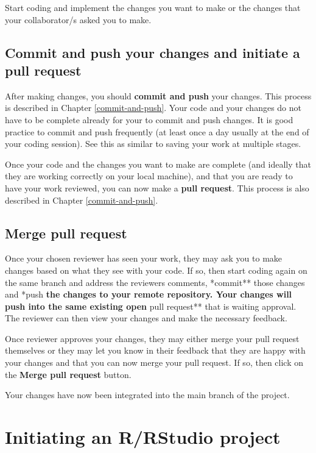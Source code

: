 \documentclass[
  12pt,
]{book}
\begin{document}
Start coding and implement the changes you want to make or the changes that your collaborator/s asked you to make.

\hypertarget{commit-and-push-your-changes-and-initiate-a-pull-request}{%
\section{Commit and push your changes and initiate a pull request}\label{commit-and-push-your-changes-and-initiate-a-pull-request}}

After making changes, you should \textbf{commit and push} your changes. This process is described in Chapter \ref{commit-and-push}. Your code and your changes do not have to be complete already for your to commit and push changes. It is good practice to commit and push frequently (at least once a day usually at the end of your coding session). See this as similar to saving your work at multiple stages.

Once your code and the changes you want to make are complete (and ideally that they are working correctly on your local machine), and that you are ready to have your work reviewed, you can now make a \textbf{pull request}. This process is also described in Chapter \ref{commit-and-push}.

\hypertarget{merge-pull-request}{%
\section{Merge pull request}\label{merge-pull-request}}

Once your chosen reviewer has seen your work, they may ask you to make changes based on what they see with your code. If so, then start coding again on the same branch and address the reviewers comments, *commit** those changes and *push\textbf{ the changes to your remote repository. Your changes will push into the same existing open }pull request** that is waiting approval. The reviewer can then view your changes and make the necessary feedback.

Once reviewer approves your changes, they may either merge your pull request themselves or they may let you know in their feedback that they are happy with your changes and that you can now merge your pull request. If so, then click on the \textbf{Merge pull request} button.

Your changes have now been integrated into the main branch of the project.

\hypertarget{initiate-projects}{%
\chapter{Initiating an R/RStudio project}\label{initiate-projects}}
\end{document}
